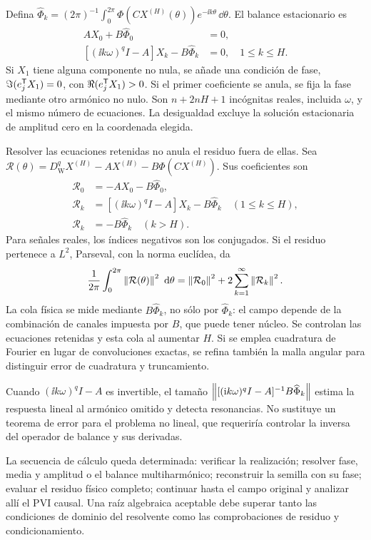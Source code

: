 Defina
\(\widehat\Phi_k=(2\pi)^{-1}\int_0^{2\pi}
\Phi(CX^{(H)}(\theta))e^{-\ii k\theta}\,\dd\theta\).
El balance estacionario es
\begin{equation}
 \begin{aligned}
 AX_0+B\widehat\Phi_0&=0,\\
 [ (\ii k\omega)^qI-A]X_k-B\widehat\Phi_k&=0,
 \quad 1\leq k\leq H.
 \end{aligned}
 \label{bre:bal:mimo-balance}
\end{equation}
Si \(X_1\) tiene alguna componente no nula, se añade una condición de fase,
\(\Im(e_j^{\mathsf T}X_1)=0\), con \(\Re(e_j^{\mathsf T}X_1)>0\).
Si el primer coeficiente se anula, se fija la fase mediante otro
armónico no nulo.
Son \(n+2nH+1\) incógnitas reales, incluida \(\omega\), y el mismo
número de ecuaciones. La desigualdad excluye la solución estacionaria
de amplitud cero en la coordenada elegida.

Resolver las ecuaciones retenidas no anula el residuo fuera de ellas.
Sea
\(\mathcal R(\theta)=D_{\mathrm W}^qX^{(H)}-AX^{(H)}
-B\Phi(CX^{(H)})\). Sus coeficientes son
\begin{equation}
 \begin{aligned}
 \mathcal R_0&=-AX_0-B\widehat\Phi_0,\\
 \mathcal R_k&=[(\ii k\omega)^qI-A]X_k-B\widehat\Phi_k
       \quad(1\leq k\leq H),\\
 \mathcal R_k&=-B\widehat\Phi_k\quad(k>H).
 \end{aligned}
 \label{bre:bal:mimo-residual}
\end{equation}
Para señales reales, los índices negativos son los conjugados. Si el
residuo pertenece a \(L^2\), Parseval, con la norma euclídea, da
\begin{equation}
 \frac1{2\pi}\int_0^{2\pi}\left\lVert\mathcal R(\theta)\right\rVert^2\,\,\mathrm d\theta
 =\left\lVert\mathcal R_0\right\rVert^2+2\sum_{k=1}^{\infty}\left\lVert\mathcal R_k\right\rVert^2.
 \label{bre:bal:parseval-residual}
\end{equation}
La cola física se mide mediante \(B\widehat\Phi_k\), no sólo por
\(\widehat\Phi_k\): el campo depende de la combinación de canales
impuesta por \(B\), que puede tener núcleo. Se controlan las ecuaciones
retenidas y esta cola al aumentar \(H\). Si se emplea cuadratura de
Fourier en lugar de convoluciones exactas, se refina también la malla
angular para distinguir error de cuadratura y truncamiento.

Cuando \((\ii k\omega)^qI-A\) es invertible, el tamaño
\(\left\lVert[(\mathrm i k\omega)^qI-A]^{-1}B\widehat\Phi_k\right\rVert\) estima la
respuesta lineal al armónico omitido y detecta resonancias. No sustituye
un teorema de error para el problema no lineal, que requeriría controlar
la inversa del operador de balance y sus derivadas.

La secuencia de cálculo queda determinada: verificar la realización;
resolver fase, media y amplitud o el balance multiharmónico; reconstruir
la semilla con su fase; evaluar el residuo físico completo; continuar
hasta el campo original y analizar allí el PVI causal. Una raíz
algebraica aceptable debe superar tanto las condiciones de dominio
del resolvente como las comprobaciones de residuo y condicionamiento.

